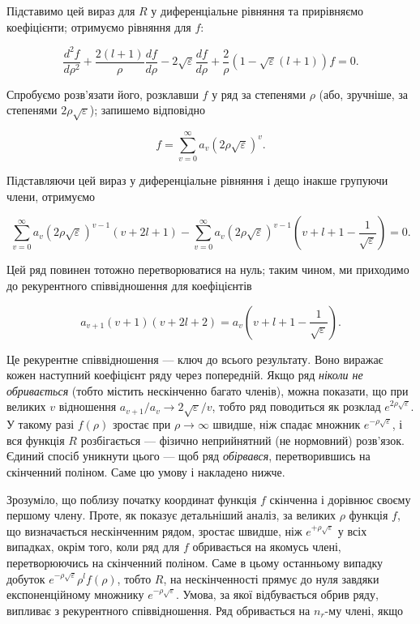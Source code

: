 \documentclass{article}
\begin{document}
Підставимо цей вираз для $R$ у диференціальне рівняння та прирівняємо коефіцієнти; отримуємо рівняння для $f$:

\begin{equation}
\frac{d^2 f}{d\rho^2} + \frac{2(l+1)}{\rho} \frac{df}{d\rho} - 2 \sqrt{\varepsilon} \frac{df}{d\rho} + \frac{2}{\rho} (1 - \sqrt{\varepsilon} (l+1)) f = 0.
\end{equation}

Спробуємо розв'язати його, розклавши $f$ у ряд за степенями $\rho$ (або, зручніше, за степенями $2\rho \sqrt{\varepsilon}$); запишемо відповідно

\begin{equation}
f = \sum_{v=0}^{\infty} a_v (2\rho \sqrt{\varepsilon})^v.
\end{equation}

Підставляючи цей вираз у диференціальне рівняння і дещо інакше групуючи члени, отримуємо

\begin{equation}
\sum_{v=0}^{\infty} a_v (2\rho \sqrt{\varepsilon})^{v-1} (v + 2l + 1) - \sum_{v=0}^{\infty} a_v (2\rho \sqrt{\varepsilon})^{v-1} \left( v + l + 1 - \frac{1}{\sqrt{\varepsilon}} \right) = 0.
\end{equation}

Цей ряд повинен тотожно перетворюватися на нуль; таким чином, ми приходимо до рекурентного співвідношення для коефіцієнтів

\begin{equation}
a_{v+1} (v + 1)(v + 2l + 2) = a_v \left( v + l + 1 - \frac{1}{\sqrt{\varepsilon}} \right).
\end{equation}

\begin{note}
Це рекурентне співвідношення --- ключ до всього результату. Воно виражає кожен наступний коефіцієнт ряду через попередній. Якщо ряд \emph{ніколи не обривається} (тобто містить нескінченно багато членів), можна показати, що при великих $v$ відношення $a_{v+1}/a_v \to 2\sqrt{\varepsilon}/v$, тобто ряд поводиться як розклад $e^{2\rho\sqrt{\varepsilon}}$. У такому разі $f(\rho)$ зростає при $\rho\to\infty$ швидше, ніж спадає множник $e^{-\rho\sqrt\varepsilon}$, і вся функція $R$ розбігається --- фізично неприйнятний (не нормовний) розв'язок. Єдиний спосіб уникнути цього --- щоб ряд \emph{обірвався}, перетворившись на скінченний поліном. Саме цю умову і накладено нижче.
\end{note}

Зрозуміло, що поблизу початку координат функція $f$ скінченна і дорівнює своєму першому члену. Проте, як показує детальніший аналіз, за великих $\rho$ функція $f$, що визначається нескінченним рядом, зростає швидше, ніж $e^{+\rho \sqrt{\varepsilon}}$ у всіх випадках, окрім того, коли ряд для $f$ обривається на якомусь члені, перетворюючись на скінченний поліном. Саме в цьому останньому випадку добуток $e^{-\rho\sqrt{\varepsilon}}\rho^l f(\rho)$, тобто $R$, на нескінченності прямує до нуля завдяки експоненційному множнику $e^{-\rho \sqrt{\varepsilon}}$. Умова, за якої відбувається обрив ряду, випливає з рекурентного співвідношення. Ряд обривається на $n_r$-му члені, якщо
\end{document}

